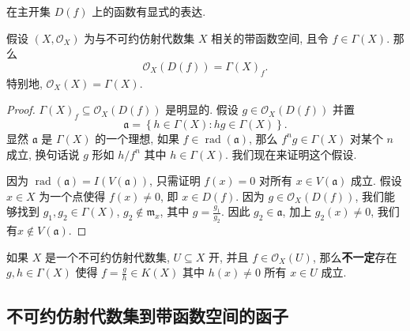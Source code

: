 在主开集 \( D(f) \) 上的函数有显式的表达.
\begin{proposition}
  \label{proposition-principal-open-space-with-functions}
  假设 \( (X, \mathscr{O}_X) \) 为与不可约仿射代数集 \( X \) 相关的带函数空间,
  且令 \( f \in \Gamma(X) \). 那么
  \[
    \mathscr{O}_X(D(f)) = \Gamma(X)_f.
  \]
  特别地, \( \mathscr{O}_X(X) = \Gamma(X) \).
\end{proposition}
\begin{proof}
  \( \Gamma(X)_f \subseteq \mathscr{O}_X(D(f)) \)  是明显的. 假设 \( g \in
  \mathscr{O}_X(D(f)) \) 并置
  \[
    \mathfrak{a} = \left\lbrace h \in \Gamma(X): hg \in \Gamma(X) \right\rbrace.
  \]
  显然 \( \mathfrak{a} \) 是 \( \Gamma(X) \) 的一个理想, 如果 \( f \in
  \operatorname{rad}(\mathfrak{a}) \), 那么 \( f^ng \in \Gamma(X) \) 对某个 \(
  n \) 成立, 换句话说 \( g \) 形如 \( h/f^n \) 其中 \( h \in \Gamma(X) \).
  我们现在来证明这个假设.

  因为 \( \operatorname{rad}(\mathfrak{a}) = I(V(\mathfrak{a})) \), 只需证明 \( f(x) = 0 \) 对所有 \( x \in
  V(\mathfrak{a}) \) 成立. 假设 \( x \in X \) 为一个点使得 \( f(x) \neq 0 \), 即
  \( x \in D(f) \). 因为 \( g \in \mathscr{O}_X(D(f)) \), 我们能够找到 \( g_1,
  g_2 \in \Gamma(X) \), \( g_2 \notin \mathfrak{m}_x \), 其中 \( g =
  \frac{g_1}{g_2} \). 因此 \( g_2 \in \mathfrak{a} \), 加上 \( g_2(x) \neq 0 \),
  我们有\( x \notin V(\mathfrak{a}) \).
\end{proof}

\begin{remark} %
  如果 \( X \) 是一个不可约仿射代数集, \( U \subseteq X \) 开, 并且 \( f \in
  \mathscr{O}_X(U) \), 那么\textbf{不一定}存在 \( g, h \in \Gamma(X) \) 使得 \(
  f = \frac{g}{h} \in K(X) \) 其中 \( h(x) \neq 0 \) 所有 \( x \in U \) 成立.
\end{remark}

\subsection{不可约仿射代数集到带函数空间的函子}

